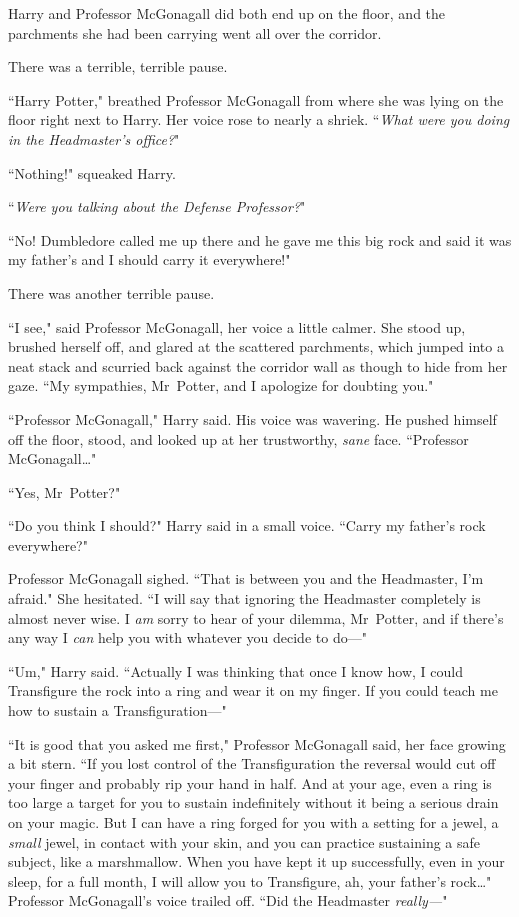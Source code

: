 Harry and Professor McGonagall did both end up on the floor, and the parchments she had been carrying went all over the corridor.

There was a terrible, terrible pause.

``Harry Potter," breathed Professor McGonagall from where she was lying on the floor right next to Harry. Her voice rose to nearly a shriek. ``\emph{What were you doing in the Headmaster's office?}"

``Nothing!" squeaked Harry.

``\emph{Were you talking about the Defense Professor?}"

``No! Dumbledore called me up there and he gave me this big rock and said it was my father's and I should carry it everywhere!"

There was another terrible pause.

``I see," said Professor McGonagall, her voice a little calmer. She stood up, brushed herself off, and glared at the scattered parchments, which jumped into a neat stack and scurried back against the corridor wall as though to hide from her gaze. ``My sympathies, Mr~Potter, and I apologize for doubting you."

``Professor McGonagall," Harry said. His voice was wavering. He pushed himself off the floor, stood, and looked up at her trustworthy, \emph{sane} face. ``Professor McGonagall{\ldots}"

``Yes, Mr~Potter?"

``Do you think I should?" Harry said in a small voice. ``Carry my father's rock everywhere?"

Professor McGonagall sighed. ``That is between you and the Headmaster, I'm afraid." She hesitated. ``I will say that ignoring the Headmaster completely is almost never wise. I \emph{am} sorry to hear of your dilemma, Mr~Potter, and if there's any way I \emph{can} help you with whatever you decide to do—"

``Um," Harry said. ``Actually I was thinking that once I know how, I could Transfigure the rock into a ring and wear it on my finger. If you could teach me how to sustain a Transfiguration—"

``It is good that you asked me first," Professor McGonagall said, her face growing a bit stern. ``If you lost control of the Transfiguration the reversal would cut off your finger and probably rip your hand in half. And at your age, even a ring is too large a target for you to sustain indefinitely without it being a serious drain on your magic. But I can have a ring forged for you with a setting for a jewel, a \emph{small} jewel, in contact with your skin, and you can practice sustaining a safe subject, like a marshmallow. When you have kept it up successfully, even in your sleep, for a full month, I will allow you to Transfigure, ah, your father's rock{\ldots}" Professor McGonagall's voice trailed off. ``Did the Headmaster \emph{really—}"

